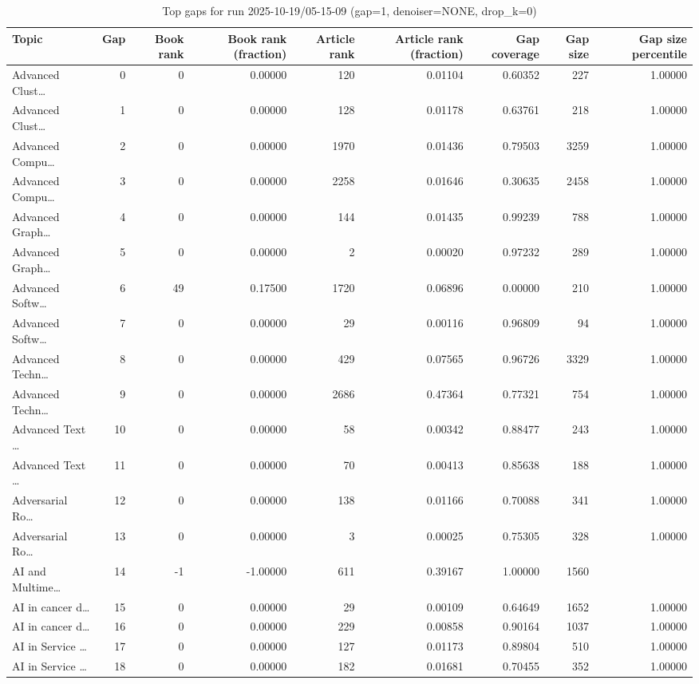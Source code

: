 \begin{table}
\caption{Top gaps for run 2025-10-19/05-15-09 (gap=1, denoiser=NONE, drop\_k=0)}
\label{tab:best_run_gap1_2025_10_19_05_15_09}
\begin{tabular}{lrrrrrrrr}
\toprule
Topic & Gap & Book rank & Book rank (fraction) & Article rank & Article rank (fraction) & Gap coverage & Gap size & Gap size percentile \\
\midrule
Advanced Clust… & 0 & 0 & 0.00000 & 120 & 0.01104 & 0.60352 & 227 & 1.00000 \\
Advanced Clust… & 1 & 0 & 0.00000 & 128 & 0.01178 & 0.63761 & 218 & 1.00000 \\
Advanced Compu… & 2 & 0 & 0.00000 & 1970 & 0.01436 & 0.79503 & 3259 & 1.00000 \\
Advanced Compu… & 3 & 0 & 0.00000 & 2258 & 0.01646 & 0.30635 & 2458 & 1.00000 \\
Advanced Graph… & 4 & 0 & 0.00000 & 144 & 0.01435 & 0.99239 & 788 & 1.00000 \\
Advanced Graph… & 5 & 0 & 0.00000 & 2 & 0.00020 & 0.97232 & 289 & 1.00000 \\
Advanced Softw… & 6 & 49 & 0.17500 & 1720 & 0.06896 & 0.00000 & 210 & 1.00000 \\
Advanced Softw… & 7 & 0 & 0.00000 & 29 & 0.00116 & 0.96809 & 94 & 1.00000 \\
Advanced Techn… & 8 & 0 & 0.00000 & 429 & 0.07565 & 0.96726 & 3329 & 1.00000 \\
Advanced Techn… & 9 & 0 & 0.00000 & 2686 & 0.47364 & 0.77321 & 754 & 1.00000 \\
Advanced Text … & 10 & 0 & 0.00000 & 58 & 0.00342 & 0.88477 & 243 & 1.00000 \\
Advanced Text … & 11 & 0 & 0.00000 & 70 & 0.00413 & 0.85638 & 188 & 1.00000 \\
Adversarial Ro… & 12 & 0 & 0.00000 & 138 & 0.01166 & 0.70088 & 341 & 1.00000 \\
Adversarial Ro… & 13 & 0 & 0.00000 & 3 & 0.00025 & 0.75305 & 328 & 1.00000 \\
AI and Multime… & 14 & -1 & -1.00000 & 611 & 0.39167 & 1.00000 & 1560 &  \\
AI in cancer d… & 15 & 0 & 0.00000 & 29 & 0.00109 & 0.64649 & 1652 & 1.00000 \\
AI in cancer d… & 16 & 0 & 0.00000 & 229 & 0.00858 & 0.90164 & 1037 & 1.00000 \\
AI in Service … & 17 & 0 & 0.00000 & 127 & 0.01173 & 0.89804 & 510 & 1.00000 \\
AI in Service … & 18 & 0 & 0.00000 & 182 & 0.01681 & 0.70455 & 352 & 1.00000 \\

\end{tabular}
\end{table}
